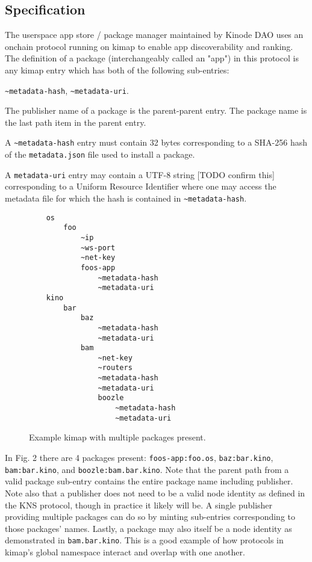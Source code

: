 \documentclass[runningheads]{llncs}
\begin{document}
\subsection{Specification}

The userspace app store / package manager maintained by Kinode DAO uses an onchain protocol running on kimap to enable app discoverability and ranking.
The definition of a package (interchangeably called an "app") in this protocol is any kimap entry which has both of the following sub-entries:

\verb|~metadata-hash|, \verb|~metadata-uri|.

The publisher name of a package is the parent-parent entry.
The package name is the last path item in the parent entry.

A \verb|~metadata-hash| entry must contain 32 bytes corresponding to a SHA-256 hash of the \verb|metadata.json| file used to install a package.

A \verb|metadata-uri| entry may contain a UTF-8 string [TODO confirm this] corresponding to a Uniform Resource Identifier where one may access the metadata file for which the hash is contained in \verb|~metadata-hash|.

\begin{figure}
    \centering
    \begin{lstlisting}
    os
        foo
            ~ip
            ~ws-port
            ~net-key
            foos-app
                ~metadata-hash
                ~metadata-uri
    kino
        bar
            baz
                ~metadata-hash
                ~metadata-uri
            bam
                ~net-key
                ~routers
                ~metadata-hash
                ~metadata-uri
                boozle
                    ~metadata-hash
                    ~metadata-uri
    \end{lstlisting}
    \caption{Example kimap with multiple packages present.}
    \label{fig:example kimap with packages}
\end{figure}

In Fig. 2 there are 4 packages present: \verb|foos-app:foo.os|, \verb|baz:bar.kino|, \verb|bam:bar.kino|, and \verb|boozle:bam.bar.kino|.
Note that the parent path from a valid package sub-entry contains the entire package name including publisher.
Note also that a publisher does not need to be a valid node identity as defined in the KNS protocol, though in practice it likely will be.
A single publisher providing multiple packages can do so by minting sub-entries corresponding to those packages' names.
Lastly, a package may also itself be a node identity as demonstrated in \verb|bam.bar.kino|.
This is a good example of how protocols in kimap's global namespace interact and overlap with one another.
\end{document}
